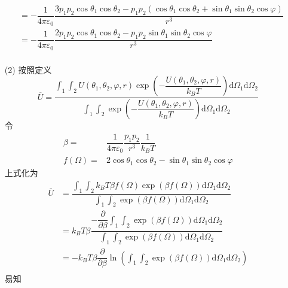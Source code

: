 \documentclass{article}
\begin{document}
\begin{itemize}
\begin{equation}
\begin{aligned}
            &= -\dfrac{1}{4\pi\varepsilon_0}\dfrac{3p_1p_2\cos\theta_1\cos\theta_2-p_1p_2(\cos\theta_1\cos\theta_2+\sin\theta_1\sin\theta_2\cos\varphi)}{r^3}\\
            &= -\dfrac{1}{4\pi\varepsilon_0}\dfrac{2p_1p_2\cos\theta_1\cos\theta_2-p_1p_2\sin\theta_1\sin\theta_2\cos\varphi}{r^3}\\
    \end{aligned}
    \end{equation}
    \item[(2)]按照定义
    \begin{equation}
        \overline{U}=\dfrac{\displaystyle\int_1\displaystyle\int_2U(\theta_1,\theta_2,\varphi,r)\exp\left(-\dfrac{U(\theta_1,\theta_2,\varphi,r)}{k_B T}\right)\mathrm{d}\Omega_1\mathrm{d}\Omega_2}{\displaystyle\int_1\displaystyle\int_2\exp\left(-\dfrac{U(\theta_1,\theta_2,\varphi,r)}{k_B T}\right)\mathrm{d}\Omega_1\mathrm{d}\Omega_2}
    \end{equation}
    令
    \begin{equation}
        \begin{aligned}
            \beta=&\dfrac{1}{4\pi\varepsilon_0}\dfrac{p_1p_2}{r^3}\dfrac{1}{k_B T}\\
            f(\Omega)=&2\cos\theta_1\cos\theta_2-\sin\theta_1\sin\theta_2\cos\varphi
        \end{aligned}
    \end{equation}
    上式化为
    \begin{equation}
        \begin{aligned}
        \overline{U}&=\dfrac{\displaystyle\int_1\displaystyle\int_2 k_B T\beta f(\Omega)\exp\left(\beta f(\Omega)\right)\mathrm{d}\Omega_1\mathrm{d}\Omega_2}{\displaystyle\int_1\displaystyle\int_2\exp\left(\beta f(\Omega)\right)\mathrm{d}\Omega_1\mathrm{d}\Omega_2}\\    
        &= k_B T\beta\dfrac{-\dfrac{\partial}{\partial \beta}\displaystyle\int_1\displaystyle\int_2\exp\left(\beta f(\Omega)\right)\mathrm{d}\Omega_1\mathrm{d}\Omega_2}{\displaystyle\int_1\displaystyle\int_2\exp\left(\beta f(\Omega)\right)\mathrm{d}\Omega_1\mathrm{d}\Omega_2}\\
        &= -k_B T\beta\dfrac{\partial}{\partial \beta}\ln\left(\displaystyle\int_1\displaystyle\int_2\exp\left(\beta f(\Omega)\right)\mathrm{d}\Omega_1\mathrm{d}\Omega_2\right)\\
        \end{aligned}
    \end{equation}
    易知
    \begin{equation}

\end{equation}
\end{itemize}
\end{document}
